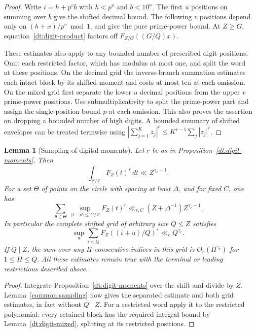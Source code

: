 \documentclass[11pt,a4paper]{article}
\theoremstyle{paperplain}
\newtheorem{lemma}[theorem]{Lemma}
\numberwithin{equation}{section}
\begin{document}
\begin{proof}
Write \(i=h+p^vb\) with \(h<p^v\) and \(b<10^u\). The first
\(u\) positions on summing over \(b\) give the shifted decimal
bound. The following \(v\) positions depend only on
\((h+x)/p^v\bmod1\), and give the pure prime-power bound.
At \(Z\ge G\), equation~\eqref{dt:digit-product} factors off
\(F_{Z/G}((G/Q)x)\).

These estimates also apply to any bounded number of prescribed
digit positions. Omit each restricted factor, which has modulus
at most one, and split the word at these positions. On the
decimal grid the inverse-branch summation estimates each intact
block by its shifted moment and costs at most ten at each
omission. On the mixed grid first separate the lower \(u\)
decimal positions from the upper \(v\) prime-power positions.
Use submultiplicativity to split the prime-power part and assign
the single-position bound \(p\) at each omission.
This also proves the assertion on dropping a bounded number
of high digits. A bounded summary of shifted envelopes can
be treated termwise using \(|\sum_{j=1}^K z_j|^r\le
K^{r-1}\sum_j|z_j|^r\).
\end{proof}

\begin{lemma}[Sampling of digital moments]\label{dt:digit-sampling}
Let \(r\) be as in Proposition~\ref{dt:digit-moments}. Then
\[
 \int_{\mathbb R/\mathbb Z} F_Z(t)^r\,dt\ll Z^{\gamma_r-1}.
\]
For a set \(\Theta\) of points on the circle with spacing at
least \(\Delta\), and for fixed \(C\), one has
\begin{equation}\label{dt:digit-separated}
 \sum_{\theta\in\Theta}\ \sup_{|t-\theta|\le C/Z}F_Z(t)^r
   \ll_{r,C} (Z+\Delta^{-1})Z^{\gamma_r-1}.
\end{equation}
In particular the complete shifted grid of arbitrary size \(Q\le Z\)
satisfies
\begin{equation}\label{dt:digit-arbitrary-grid}
 \sup_u\sum_{i<Q}F_Z((i+u)/Q)^r\ll_r Q^{\gamma_r}.
\end{equation}
If \(Q\mid Z\), the sum over any \(H\) consecutive indices
in this grid is \(O_r(H^{\gamma_r})\) for \(1\le H\le Q\).
All these estimates remain true with the terminal or leading
restrictions described above.
\end{lemma}

\begin{proof}
Integrate Proposition~\ref{dt:digit-moments} over the shift and
divide by $Z$. Lemma~\ref{common:sampling} now gives the separated
estimate and both grid estimates, in fact without $Q\mid Z$.
For a restricted word apply it to the restricted polynomial:
every retained block has the required integral bound by
Lemma~\ref{dt:digit-mixed}, splitting at its restricted positions.
\end{proof}
\end{document}
